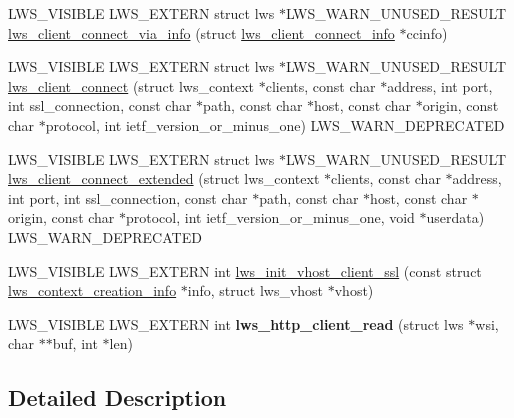 \begin{DoxyCompactItemize}
\item 
L\+W\+S\+\_\+\+V\+I\+S\+I\+B\+LE L\+W\+S\+\_\+\+E\+X\+T\+E\+RN struct lws $\ast$L\+W\+S\+\_\+\+W\+A\+R\+N\+\_\+\+U\+N\+U\+S\+E\+D\+\_\+\+R\+E\+S\+U\+LT \hyperlink{group__client_gac30a7be106abd0cedfbb2e8b8fe3a2f5}{lws\+\_\+client\+\_\+connect\+\_\+via\+\_\+info} (struct \hyperlink{structlws__client__connect__info}{lws\+\_\+client\+\_\+connect\+\_\+info} $\ast$ccinfo)
\item 
L\+W\+S\+\_\+\+V\+I\+S\+I\+B\+LE L\+W\+S\+\_\+\+E\+X\+T\+E\+RN struct lws $\ast$L\+W\+S\+\_\+\+W\+A\+R\+N\+\_\+\+U\+N\+U\+S\+E\+D\+\_\+\+R\+E\+S\+U\+LT \hyperlink{group__client_ga4af0a20108a95e8b6d94dd4d80055ff3}{lws\+\_\+client\+\_\+connect} (struct lws\+\_\+context $\ast$clients, const char $\ast$address, int port, int ssl\+\_\+connection, const char $\ast$path, const char $\ast$host, const char $\ast$origin, const char $\ast$protocol, int ietf\+\_\+version\+\_\+or\+\_\+minus\+\_\+one) L\+W\+S\+\_\+\+W\+A\+R\+N\+\_\+\+D\+E\+P\+R\+E\+C\+A\+T\+ED
\item 
L\+W\+S\+\_\+\+V\+I\+S\+I\+B\+LE L\+W\+S\+\_\+\+E\+X\+T\+E\+RN struct lws $\ast$L\+W\+S\+\_\+\+W\+A\+R\+N\+\_\+\+U\+N\+U\+S\+E\+D\+\_\+\+R\+E\+S\+U\+LT \hyperlink{group__client_gac6a8558b4410961a880241c2ac1271e2}{lws\+\_\+client\+\_\+connect\+\_\+extended} (struct lws\+\_\+context $\ast$clients, const char $\ast$address, int port, int ssl\+\_\+connection, const char $\ast$path, const char $\ast$host, const char $\ast$origin, const char $\ast$protocol, int ietf\+\_\+version\+\_\+or\+\_\+minus\+\_\+one, void $\ast$userdata) L\+W\+S\+\_\+\+W\+A\+R\+N\+\_\+\+D\+E\+P\+R\+E\+C\+A\+T\+ED
\item 
L\+W\+S\+\_\+\+V\+I\+S\+I\+B\+LE L\+W\+S\+\_\+\+E\+X\+T\+E\+RN int \hyperlink{group__client_ga4f44b8230e6732816ca5cd8d1aaaf340}{lws\+\_\+init\+\_\+vhost\+\_\+client\+\_\+ssl} (const struct \hyperlink{structlws__context__creation__info}{lws\+\_\+context\+\_\+creation\+\_\+info} $\ast$info, struct lws\+\_\+vhost $\ast$vhost)
\item 
L\+W\+S\+\_\+\+V\+I\+S\+I\+B\+LE L\+W\+S\+\_\+\+E\+X\+T\+E\+RN int {\bfseries lws\+\_\+http\+\_\+client\+\_\+read} (struct lws $\ast$wsi, char $\ast$$\ast$buf, int $\ast$len)\hypertarget{group__client_ga4450c34200bf9dab3beb90ef23221870}{}\label{group__client_ga4450c34200bf9dab3beb90ef23221870}

\end{DoxyCompactItemize}


\subsection{Detailed Description}
